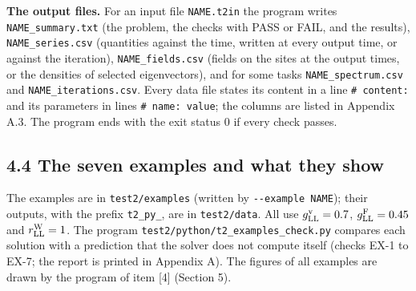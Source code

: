 \documentclass[
  10pt,
]{article}
\begin{document}
\textbf{The output files.} For an input file \texttt{NAME.t2in} the
program writes \texttt{NAME\_summary.txt} (the problem, the checks with
PASS or FAIL, and the results), \texttt{NAME\_series.csv} (quantities
against the time, written at every output time, or against the
iteration), \texttt{NAME\_fields.csv} (fields on the sites at the output
times, or the densities of selected eigenvectors), and for some tasks
\texttt{NAME\_spectrum.csv} and \texttt{NAME\_iterations.csv}. Every
data file states its content in a line \texttt{\#\ content:} and its
parameters in lines \texttt{\#\ name:\ value}; the columns are listed in
Appendix A.3. The program ends with the exit status 0 if every check
passes.

\hypertarget{the-seven-examples-and-what-they-show}{%
\subsection{4.4 The seven examples and what they
show}\label{the-seven-examples-and-what-they-show}}

The examples are in \texttt{test2/examples} (written by
\texttt{-\/-example\ NAME}); their outputs, with the prefix
\texttt{t2\_py\_}, are in \texttt{test2/data}. All use
\(g^{\rm v}_{\rm LL}=0.7\), \(g^{\rm F}_{\rm LL}=0.45\) and
\(r^{\rm W}_{\rm LL}=1\). The program
\texttt{test2/python/t2\_examples\_check.py} compares each solution with
a prediction that the solver does not compute itself (checks EX-1 to
EX-7; the report is printed in Appendix A). The figures of all examples
are drawn by the program of item {[}4{]} (Section 5).
\end{document}
